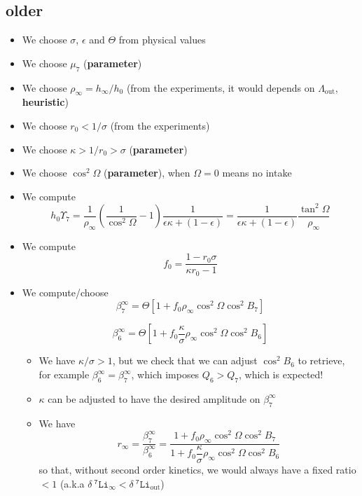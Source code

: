 \documentclass[aps,onecolumn,10pt]{revtex4}
\newcommand{\mychem}[1]{\mathtt{#1}}
\newcommand{\spLi}[1]{{~^{\mychem{#1}}\mychem{Li}}}
\newcommand{\deltaLi}{ {\delta\!\!\!\spLi{7}} }
\newcommand{\deltaLiOut}{{\deltaLi}_{\mathrm{out}}}
\newcommand{\LiAll}{\Lambda}
\newcommand{\LiAllOut}{{\LiAll}_{\mathrm{out}}}
\begin{document}
\subsection{older}

\color{blue}

\begin{itemize}
\item We choose $\sigma$, $\epsilon$ and $\Theta$ from physical values
\item We choose $\mu_7$ (\textbf{parameter})
\item We choose $\rho_\infty=h_\infty/h_0$ (from the experiments, it would depends on $\LiAllOut$, \textbf{heuristic})
\item We choose $r_0<1/\sigma$  (from the experiments)
\item We choose $\kappa>1/r_0>\sigma$ (\textbf{parameter})
\item We choose $\cos^2\Omega$ (\textbf{parameter}), when $\Omega=0$ means no intake
\item We compute 
$$
	h_0\Upsilon_7 = \dfrac{1}{\rho_\infty}\left(\dfrac{1}{\cos^2\Omega}-1\right)\dfrac{1}{\epsilon\kappa+(1-\epsilon)}
	= \dfrac{1}{\epsilon\kappa+(1-\epsilon)} \dfrac{\tan^2\Omega}{\rho_\infty}
$$
\item We compute
$$
	f_0 = \dfrac{1-r_0\sigma}{\kappa r_0-1}
$$
\item We compute/choose
$$
	\beta_7^\infty = \Theta \left[ 1 + f_0 \rho_\infty \cos^2\Omega \cos^2 B_7 \right]
$$

$$	
	\beta_6^\infty = \Theta \left[ 1 + f_0 \dfrac{\kappa}{\sigma} \rho_\infty \cos^2\Omega \cos^2 B_6 \right]
$$
\begin{itemize}
\item
We have $\kappa/\sigma>1$, but we check that we can adjust $\cos^2 B_6$ to retrieve, for example $\beta_6^\infty=\beta_7^\infty$, which imposes
$Q_6>Q_7$, which is expected!
\item $\kappa$ can be adjusted to have the desired amplitude on $\beta_7^\infty$
\item We have
$$
	r_\infty = \dfrac{\beta_7^\infty}{\beta_6^\infty} = \dfrac{ 1 + f_0 \rho_\infty \cos^2\Omega \cos^2 B_7}{1 + f_0 \dfrac{\kappa}{\sigma} \rho_\infty \cos^2\Omega \cos^2 B_6}
$$
so that, without second order kinetics, we would always have a fixed ratio $<1$ (a.k.a $\deltaLi_\infty<\deltaLiOut$)
\end{itemize}
\end{itemize}
\end{document}
